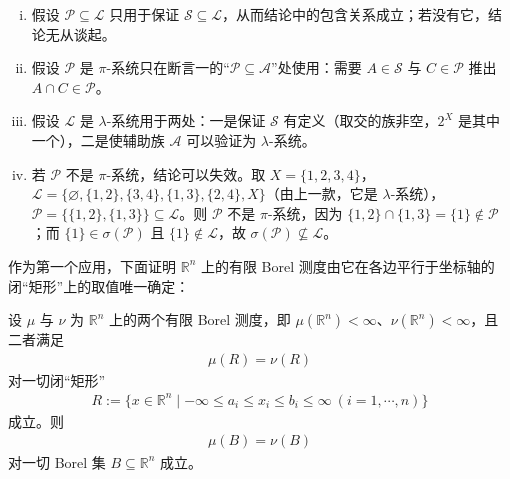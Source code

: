 \documentclass[../../main.tex]{subfiles}
\begin{document}
\begin{remark}\label{remark:ch01-thm-1-4-条件}
\begin{enumerate}[(i)]
\item 假设 $\mathcal{P}\subseteq\mathcal{L}$ 只用于保证 $\mathcal{S}\subseteq\mathcal{L}$，从而结论中的包含关系成立；若没有它，结论无从谈起。
\item 假设 $\mathcal{P}$ 是 $\pi$-系统只在断言一的“$\mathcal{P}\subseteq\mathcal{A}$”处使用：需要 $A\in\mathcal{S}$ 与 $C\in\mathcal{P}$ 推出 $A\cap C\in\mathcal{P}$。
\item 假设 $\mathcal{L}$ 是 $\lambda$-系统用于两处：一是保证 $\mathcal{S}$ 有定义（取交的族非空，$2^{X}$ 是其中一个），二是使辅助族 $\mathcal{A}$ 可以验证为 $\lambda$-系统。
\item 若 $\mathcal{P}$ 不是 $\pi$-系统，结论可以失效。取 $X=\{1,2,3,4\}$，$\mathcal{L}=\{\varnothing,\{1,2\},\{3,4\},\{1,3\},\{2,4\},X\}$（由上一款，它是 $\lambda$-系统），$\mathcal{P}=\{\{1,2\},\{1,3\}\}\subseteq\mathcal{L}$。则 $\mathcal{P}$ 不是 $\pi$-系统，因为 $\{1,2\}\cap\{1,3\}=\{1\}\notin\mathcal{P}$；而 $\{1\}\in\sigma(\mathcal{P})$ 且 $\{1\}\notin\mathcal{L}$，故 $\sigma(\mathcal{P})\nsubseteq\mathcal{L}$。
\end{enumerate}
\end{remark}

作为第一个应用，下面证明 $\mathbb{R}^{n}$ 上的有限 Borel 测度由它在各边平行于坐标轴的闭“矩形”上的取值唯一确定：

\begin{theorem}\label{theorem:ch01-1-5}
设 $\mu$ 与 $\nu$ 为 $\mathbb{R}^{n}$ 上的两个有限 Borel 测度，即 $\mu(\mathbb{R}^{n})<\infty$、$\nu(\mathbb{R}^{n})<\infty$，且二者满足
\begin{align*}
\mu(R)=\nu(R)
\end{align*}
对一切闭“矩形”
\begin{align*}
R:=\{x\in\mathbb{R}^{n}\mid-\infty\leqslant a_{i}\leqslant x_{i}\leqslant b_{i}\leqslant\infty\ (i=1,\cdots,n)\}
\end{align*}
成立。则
\begin{align*}
\mu(B)=\nu(B)
\end{align*}
对一切 Borel 集 $B\subseteq\mathbb{R}^{n}$ 成立。
\end{theorem}
\end{document}
